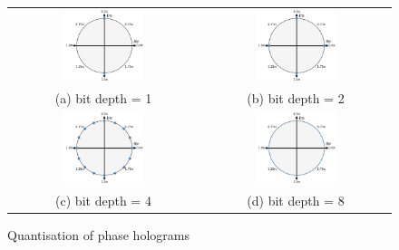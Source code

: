 	\begin{figure} [H]
		\begin{center}
			\begin{tabular}{c c}
				\includegraphics[width = 0.44\textwidth]{Quantization_bit_depth_1.jpg} & \includegraphics[width = 0.44\textwidth]{Quantization_bit_depth_2.jpg} \\ 
				(a) bit depth = 1 & (b) bit depth = 2 \\
				\includegraphics[width = 0.44\textwidth]{Quantization_bit_depth_4.jpg} & \includegraphics[width = 0.44\textwidth]{Quantization_bit_depth_8.jpg} \\
				 (c) bit depth = 4 & (d) bit depth = 8
			\end{tabular}
			\caption{\label{fig:Quantisation_bit_depth} Quantisation of phase holograms}
		\end{center}
	\end{figure}

